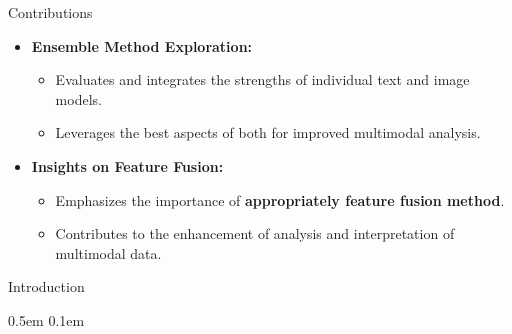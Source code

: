 \documentclass[final]{beamer}
\newlength{\colwidth}
\begin{document}
\begin{frame}[t]
\begin{columns}[t]
\begin{column}{\colwidth}
\begin{alertblock}{Contributions}
\begin{itemize}
        \item \textbf{Ensemble Method Exploration:}
        \begin{itemize}
            \item Evaluates and integrates the strengths of individual text and image models.
            \item Leverages the best aspects of both for improved multimodal analysis.
        \end{itemize}
        
        \item \textbf{Insights on Feature Fusion:}
        \begin{itemize}
            \item Emphasizes the importance of \textbf{appropriately feature fusion method}.
            \item Contributes to the enhancement of analysis and interpretation of multimodal data.
        \end{itemize}
    \end{itemize}


    \end{alertblock}


  \begin{block}{Introduction}

    \begin{enumerate}
        \itemsep0.5em %
        \parskip0.1em %
        

\end{enumerate}
\end{block}
\end{column}
\end{columns}
\end{frame}
\end{document}
